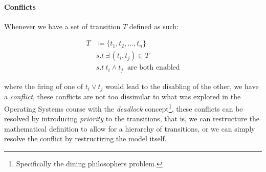 \documentclass[openright, twoside, twocolumn]{report}
\begin{document}
    \paragraph{Conflicts}
    Whenever we have a set of transition $T$ defined as such:

  \begin{align}
    T &\coloneqq  \{ t_1, t_2, \ldots, t_n \}\\
    &s.t \ \exists\, (t_i, t_j) \in T \\
    &s.t \ t_i \land  t_j\ \text{ are both enabled}
  \end{align}

    where the firing of one of $t_i \lor t_j$ would lead to the disabling of
    the other, we have a \emph{conflict}, these conflicts are not too dissimilar to what was explored in the
    Operating Systems course with the \emph{deadlock} concept\footnote{
      Specifically the dining philosophers problem.
    }, these conflicts can be resolved by introducing \emph{priority} to the transitions, that is, we can
    restructure the mathematical definition to allow for a hierarchy of transitions, or we can simply resolve
    the conflict by restructiring the model itself.
\end{document}
